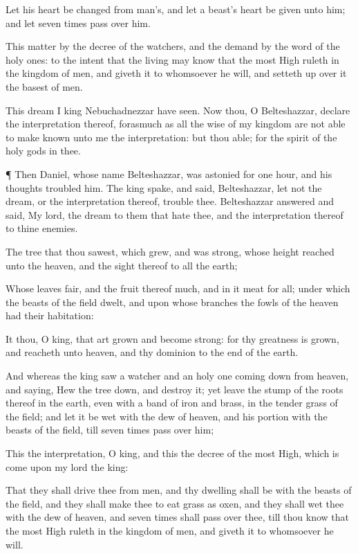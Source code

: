 {Let his
heart be
changed
from
man’s, and let a
beast’s
heart be
given unto him; and let
seven
times
pass
over him.

This
matter
{} by the
decree of the
watchers, and the
demand by the
word of the holy
ones:
to the
intent that the
living may
know that the most
High
ruleth in the
kingdom of
men, and
giveth it to
whomsoever he
will, and setteth
up
over it the
basest of
men.

This
dream
I
king
Nebuchadnezzar have
seen. Now
thou, O
Belteshazzar,
declare the
interpretation thereof, forasmuch
as
all the
wise
{} of my
kingdom are
not
able to make
known unto me the
interpretation: but
thou
{}
able; for the
spirit of the
holy
gods
{} in thee.


\par }{\PP {}¶
Then
Daniel, whose
name
{}
Belteshazzar, was
astonied for
one
hour, and his
thoughts
troubled him. The
king
spake, and
said,
Belteshazzar, let
not the
dream, or the
interpretation thereof,
trouble thee.
Belteshazzar
answered and
said, My
lord, the
dream
{} to them that
hate thee, and the
interpretation thereof to thine
enemies.

The
tree that thou
sawest, which
grew, and was
strong, whose
height
reached unto the
heaven, and the
sight thereof to
all the
earth;

Whose
leaves
{}
fair, and the
fruit thereof
much, and in it
{}
meat for
all;
under which the
beasts of the
field
dwelt, and upon whose
branches the
fowls of the
heaven had their
habitation:

It
{}
thou, O
king, that art
grown and become
strong: for thy
greatness is
grown, and
reacheth unto
heaven, and thy
dominion to the
end of the
earth.

And whereas the
king
saw a
watcher and an holy
one coming
down
from
heaven, and
saying,
Hew the
tree
down, and
destroy it;
yet
leave the
stump of the
roots thereof in the
earth, even with a
band of
iron and
brass, in the tender
grass of the
field; and let it be
wet with the
dew of
heaven, and
{} his
portion
{}
with the
beasts of the
field,
till
seven
times
pass
over him;

This
{} the
interpretation, O
king, and
this
{} the
decree of the most
High, which is
come
upon my
lord the
king:

That they shall
drive thee
from
men, and thy
dwelling shall
be
with the
beasts of the
field, and they shall make thee to
eat
grass as
oxen, and they shall
wet thee with the
dew of
heaven, and
seven
times shall
pass
over thee,
till thou
know that the most
High
ruleth in the
kingdom of
men, and
giveth it to
whomsoever he
will.

}
